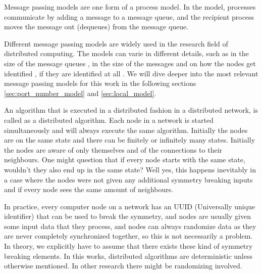 Message passing models are one form of a process model.
In the model, processes communicate by adding a message to a message queue, and the recipient process moves the message out (dequeues) from the message queue.
\cite{DBLP:books/el/leeuwen90/LamportL90}

Different message passing models are widely used in the research field of distributed computing.
The models can varie in different details, such as in the size of the message queues \cite{DBLP:books/el/leeuwen90/LamportL90}, in the size of the messages \cite{peleg2000distributed} and on how the nodes get identified \cite{DBLP:conf/focs/Linial87}, if they are identified at all \cite{DBLP:conf/istcs/MayerNS95}.
We will dive deeper into the most relevant message passing models for this work in the following sections \ref{sec:port_number_model} and \ref{sec:local_model}.

An algorithm that is executed in a distributed fashion in a distributed network, is called as a distributed algorithm.
Each node in a network is started simultaneously and will always execute the same algorithm.
Initially the nodes are on the same state and there can be finitely or infinitely many states.
Initially the nodes are aware of only themselves and of the connections to their neighbours.
One might question that if every node starts with the same state, wouldn't they also end up in the same state?
Well yes, this happens inevitably in a case where the nodes were not given any additional symmetry breaking inputs and if every node sees the same amount of neighbours.
\cite{HirvonenSuomelaDistAlg2020}



In practice, every computer node on a network has an UUID (Universally unique identifier) that can be used to break the symmetry, and nodes are usually given some input data that they process, and nodes can always randomize data as they are never completely synchronized together, so this is not necessarily a problem.
In theory, we explicitly have to assume that there exists these kind of symmetry breaking elements.
In this works, distributed algorithms are deterministic unless otherwise mentioned.
In other research there might be randomizing involved.


